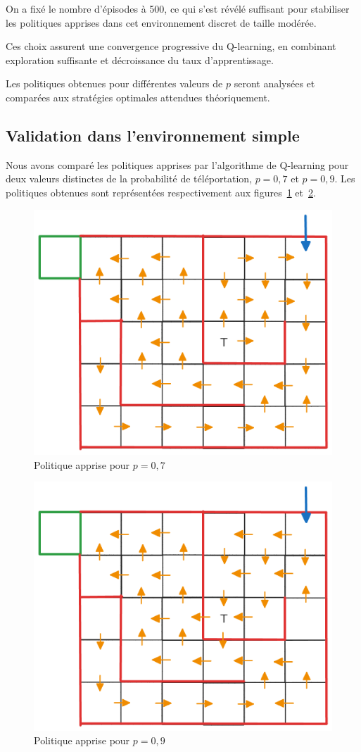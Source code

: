\documentclass[12pt]{article}
\begin{document}
On a fixé le nombre d’épisodes à 500, ce qui s’est révélé suffisant pour stabiliser les politiques apprises dans cet environnement discret de taille modérée.

Ces choix assurent une convergence progressive du Q-learning, en combinant exploration suffisante et décroissance du taux d’apprentissage.

Les politiques obtenues pour différentes valeurs de \( p \) seront analysées et comparées aux stratégies optimales attendues théoriquement.


\subsection{Validation dans l’environnement simple}


Nous avons comparé les politiques apprises par l’algorithme de Q-learning pour deux valeurs distinctes de la probabilité de téléportation, \( p = 0{,}7 \) et \( p = 0{,}9 \). Les politiques obtenues sont représentées respectivement aux figures~\ref{fig:pol_p07} et~\ref{fig:pol_p09}.

\begin{figure}[H]
    \centering
    \includegraphics[width=0.50\linewidth]{labyrinthe07.png}
    \caption{Politique apprise pour \( p = 0{,}7 \)}
    \label{fig:pol_p07}
\end{figure}

\begin{figure}[H]
    \centering
    \includegraphics[width=0.50\linewidth]{labyrinthe09.png}
    \caption{Politique apprise pour \( p = 0{,}9 \)}
    \label{fig:pol_p09}
\end{figure}
\end{document}
